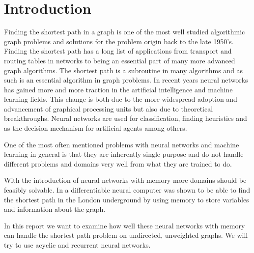 
\section{Introduction}
Finding the shortest path in a graph is one of the most well studied algorithmic graph problems and solutions for the problem origin back to the late 1950's. Finding the shortest path has a long list of applications from transport and routing tables in networks to being an essential part of many more advanced graph algorithms. The shortest path is a subroutine in many algorithms and as such is an essential algorithm in graph problems. In recent years neural networks has gained more and more traction in the artificial intelligence and machine learning fields. This change is both due to the more widespread adoption and advancement of graphical processing units but also due to theoretical breakthroughs. Neural networks are used for classification, finding heuristics and as the decision mechanism for artificial agents among others.

\newpar One of the most often mentioned problems with neural networks and machine learning in general is that they are inherently single purpose and do not handle different problems and domains very well from what they are trained to do.

\newpar With the introduction of neural networks with memory more domains should be feasibly solvable. In \cite{graves2016hybrid} a differentiable neural computer was shown to be able to find the shortest path in the London underground by using memory to store variables and information about the graph.

\newpar In this report we want to examine how well these neural networks with memory can handle the shortest path problem on undirected, unweighted graphs. We will try to use acyclic and recurrent neural networks.